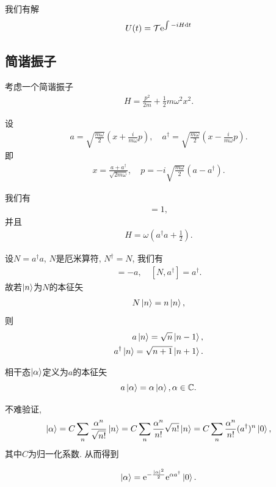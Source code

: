 我们有解
\begin{align}
    U(t)=\mathcal T\mathrm e^{\int-iH\mathrm d t}
\end{align}

\subsection{简谐振子}
考虑一个简谐振子
\begin{align}
    H=\frac{p^2}{2m}+\frac12m\omega^2x^2.
\end{align}

设
\begin{align}
    a=\sqrt{\frac{m\omega}{2}}\left(x+\frac{i}{m\omega}p\right), \quad a^\dagger=\sqrt{\frac{m\omega}{2}}\left(x-\frac{i}{m\omega}p\right).
\end{align}
即
\begin{align}
    x=\frac{a+a^\dagger}{\sqrt{2m\omega}}, \quad p=-i\sqrt{\frac{m\omega}2}(a-a^\dagger).
\end{align}

我们有
\begin{align}
    [a, a^\dagger]=1,
\end{align}
并且
\begin{align}
    H=\omega\left(a^\dagger a+\frac12\right).
\end{align}

设$N=a^\dagger a$, $N$是厄米算符, $N^\dagger=N$, 我们有
\begin{align}
    [N, a]=-a, \quad [N, a^\dagger]=a^\dagger.
\end{align}
故若$\ket n$为$N$的本征矢
\begin{align}
    N\ket n=n\ket n,
\end{align}
则
\begin{align}
    a\ket n=\sqrt n\ket{n-1},\\
    a^\dagger\ket n=\sqrt{n+1}\ket{n+1}.
\end{align}

\begin{definition}
    相干态$\ket\alpha$定义为$a$的本征矢
    \begin{equation}
        a\ket\alpha=\alpha\ket\alpha, \alpha\in\mathbb C.
    \end{equation}
\end{definition}
不难验证, 
\begin{align}
    \ket\alpha=C\sum_n\frac{\alpha^n}{\sqrt{n!}}\ket n=C\sum_n\frac{\alpha^n}{n!}\sqrt{n!}\ket n=C\sum_n\frac{\alpha^n}{n!}(a^\dagger)^n\ket0,
\end{align}
其中$C$为归一化系数. 从而得到
\begin{theorem}
    \begin{align}
        \ket\alpha=\mathrm e^{-\frac{|\alpha|^2}2}\mathrm e^{\alpha a^\dagger}\ket 0.
    \end{align}
\end{theorem}

